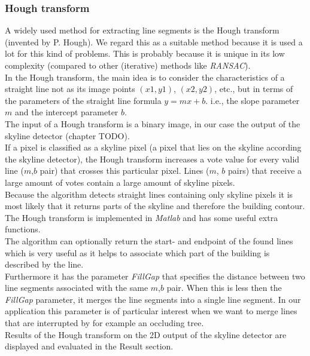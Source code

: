 \documentclass[10pt]{article}
\begin{document}
{\subsubsection{Hough transform}
	A widely used method for extracting line segments is the Hough transform
	(invented by P. Hough).  We regard this as a suitable method because it is
	used a lot for this kind of problems. This is probably because it is unique
	in its low complexity (compared to other (iterative) methods like
	\emph{RANSAC}).\\
	In the Hough transform, the main idea is to consider the characteristics of a
	straight line not as its image points $(x1, y1)$, $(x2, y2)$, etc., but in
	terms of the parameters of the straight line formula $y = mx + b$. i.e., the
	slope parameter $m$ and the intercept parameter $b$.\\
	The input of a Hough transform is a binary image, in our case the output of 
	the skyline detector (chapter TODO).\\
	If a pixel is classified as a skyline pixel (a pixel that lies on the
	skyline according the skyline detector), the Hough transform increases
	a vote value for every valid line ($m$,$b$ pair) that crosses this
	particular pixel.  Lines ($m$, $b$ pairs) that receive a large amount of votes
	contain a large amount of skyline pixels.\\
	Because the algorithm detects straight lines containing only skyline pixels it is
	most likely that it returns parts of the skyline and therefore the building contour. \\
	The Hough transform is implemented in \emph{Matlab} and has some useful extra functions.\\
	The algorithm can optionally return the start- and endpoint of the found lines 
	which is very useful as it helps to associate which part of the building is
	described by the line.\\
	Furthermore it has the parameter \emph{FillGap} that specifies the distance
	between two line segments associated with the same $m$,$b$ pair.  When this
	is less then the \emph{FillGap} parameter, it merges the line segments into
	a single line segment. In our application this parameter is of particular
	interest when we want to merge lines that are interrupted by for example an
	occluding tree.\\
	Results of the Hough transform on the 2D output of the skyline detector are
	displayed and evaluated in the Result section.



}
\end{document}
